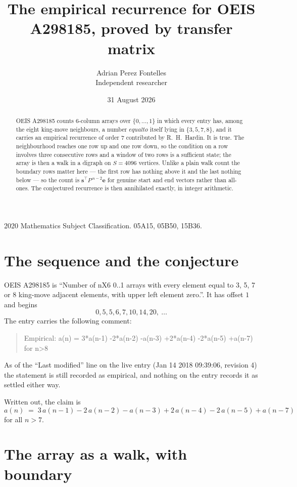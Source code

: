 \documentclass[11pt,a4paper]{article}
\title{The empirical recurrence for OEIS A298185, proved by transfer matrix}
\author{Adrian Perez Fontelles\\ \small Independent researcher}
\date{31 August 2026}
\theoremstyle{plain}
\theoremstyle{definition}
\begin{document}
\maketitle

\begin{abstract}
OEIS A298185 counts $6$-column arrays over $\{0,\dots,1\}$ in which every entry has,
among the eight king-move neighbours, a number $equal to$ itself lying in $\{3,5,7,8\}$, and it carries an empirical
recurrence of order $7$ contributed by R.~H.~Hardin. It is true. The neighbourhood
reaches one row up and one row down, so the condition on a row involves three consecutive
rows and a window of two rows is a sufficient state; the array is then a walk in a digraph
on $S=4096$ vertices. Unlike a plain walk count the boundary rows matter here --- the first
row has nothing above it and the last nothing below --- so the count is
$\mathbf{s}^{\!\top}P^{\,n-2}\mathbf{e}$ for genuine start and end vectors rather than
all-ones. The conjectured recurrence is then annihilated exactly, in integer arithmetic.
\end{abstract}

\noindent\small 2020 Mathematics Subject Classification. 05A15, 05B50, 15B36.\normalsize

\section{The sequence and the conjecture}

OEIS A298185 is ``Number of nX6 0..1 arrays with every element equal to 3, 5, 7 or 8 king-move adjacent elements, with upper left element zero.''. It has offset
$1$ and begins
\[
0, 5, 5, 6, 7, 10, 14, 20,\ \dots
\]
The entry carries the following comment:
\begin{quote}\small
Empirical: a(n) = 3*a(n-1) -2*a(n-2) -a(n-3) +2*a(n-4) -2*a(n-5) +a(n-7) for n>8
\end{quote}
As of the ``Last modified'' line on the live entry (Jan 14 2018 09:39:06, revision
4) the statement is still recorded as empirical, and nothing on the entry
records it as settled either way.

Written out, the claim is
\begin{equation}\label{eq:conj}
a(n)\;=\;3\,a(n-1) - 2\,a(n-2) - a(n-3) + 2\,a(n-4) - 2\,a(n-5) + a(n-7)
\end{equation}
for all $n>7$.

\section{The array as a walk, with boundary}
\end{document}
